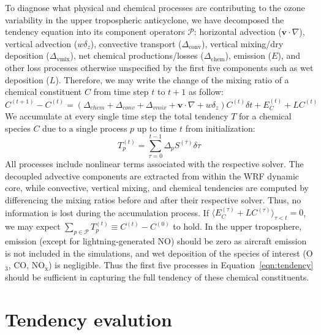 To diagnose what physical and chemical processes are contributing to the ozone variability in
the upper tropospheric anticyclone, we have decomposed the tendency equation into its
component operators $\mathcal{P}$: horizontal advection ($\mathbf{v}\cdot\nabla$), vertical advection ($w\delta_z$),
convective transport ($\Delta_{\mathrm{conv}}$), vertical mixing/dry deposition ($\Delta_{\mathrm{vmix}}$),
net chemical productions/losses ($\Delta_{\mathrm{chem}}$), emission ($E$), and other loss
processes otherwise unspecified by the first five components such as wet deposition ($L$).
Therefore, we may write the change of the mixing ratio of a chemical constituent $C$ from time step $t$ to $t+1$
as follow:
\begin{equation}\label{eqn:fulltendency}
C^{(t+1)}-C^{(t)} = (\Delta_{chem}+\Delta_{conv}+\Delta_{vmix}+
\mathbf{v}\cdot\nabla+w\delta_z)C^{(t)}\delta t + E_C^{(t)}+LC^{(t)}
\end{equation}
We accumulate at every single time step the total tendency $T$ for a chemical species $C$ due to a single process $p$ up
to time $t$ from initialization:
\begin{equation}\label{eqn:tendency}
T_p^{(t)}=\sum_{\tau=0}^{t-1}\Delta_pS^{(\tau)}\delta\tau
\end{equation}
All processes include nonlinear terms associated with the respective solver. The decoupled advective
components are extracted from within the WRF dynamic core, while convective, vertical mixing, and chemical
tendencies are computed by differencing the mixing ratios before and after their respective solver. Thus,
no information is lost during the accumulation process. If
$\langle E_C^{(\tau)}+LC^{(\tau)}\rangle_{\tau<t}=0$,
we may expect $\sum_{p\in\mathcal{P}}T_p^{(t)}\equiv C^{(t)}-C^{(0)}$ to hold.
In the upper troposphere, emission (except for lightning-generated NO) should be zero as aircraft
emission is not included in the simulations, and wet deposition of the species of interest (O$_3$, CO,
$\mathrm{NO_x}$) is negligible. Thus the first five processes in Equation~\ref{eqn:tendency}
should be sufficient in capturing the full tendency of these chemical constituents.

\section{Tendency evalution}\label{sect:tendency}

